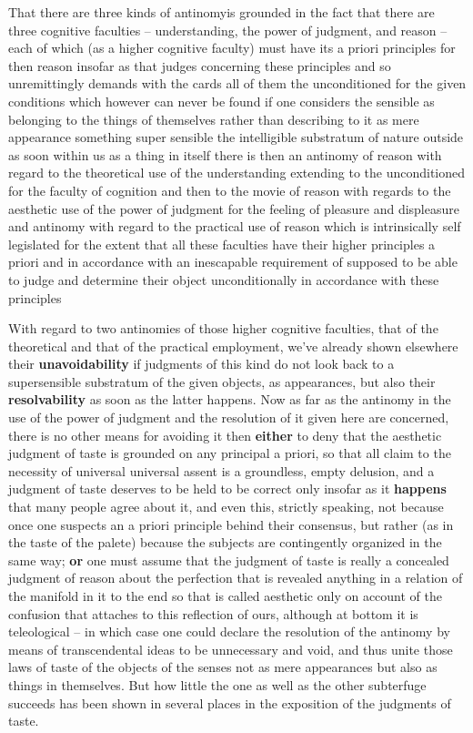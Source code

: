 \documentclass{article}
\begin{document}
That there are three kinds of antinomyis grounded 
in the fact that there are three cognitive faculties --
understanding, the power of judgment, and reason --
each of which (as a higher cognitive faculty) must have its a priori principles 
for then reason insofar as that judges concerning these principles
and so unremittingly demands with the cards all of them the unconditioned 
for the given conditions which however can never be found if one considers
the sensible as belonging to the things of themselves
rather than describing to it as mere appearance something super sensible 
the intelligible substratum of nature outside as soon within us 
as a thing in itself there is then an antinomy of reason with regard 
to the theoretical use of the understanding extending to the unconditioned 
for the faculty of cognition and then to the movie of reason with regards
to the aesthetic use of the power of judgment for the feeling of pleasure
and displeasure and antinomy with regard to the practical use of reason
which is intrinsically self legislated for the extent that all these faculties 
have their higher principles a priori and in accordance with an inescapable 
requirement of supposed to be able to judge and determine their object
unconditionally in accordance with these principles

With regard to two antinomies of those higher cognitive faculties,
that of the theoretical and that of the practical employment, 
we've already shown elsewhere their \textbf{unavoidability} 
if judgments of this kind do not look back to a supersensible substratum
of the given objects, as appearances, but also their \textbf{resolvability} 
as soon as the latter happens.
Now as far as the antinomy in the use of the power of judgment 
and the resolution of it given here are concerned, 
there is no other means for avoiding it then
\textbf{either} to deny that the
aesthetic judgment of taste is grounded on any principal a priori, 
so that all claim to the necessity of universal universal assent is a 
groundless, empty delusion, and a judgment of taste deserves to be held to be
correct only insofar as it \textbf{happens} that many people agree about it,
and even this, strictly speaking, not because once one suspects an a priori 
principle behind their consensus, but rather (as in the taste of the palete)
because the subjects are contingently organized in the same way;
\textbf{or} one must assume that the judgment of taste is really a concealed 
judgment of reason about the perfection that is revealed anything in a relation
of the manifold in it to the end so that is called aesthetic only on account
of the confusion that attaches to this reflection of ours, although at
bottom it is teleological -- in which case one could declare the resolution
of the antinomy by means of transcendental ideas to be unnecessary 
and void, and thus unite those laws of taste of the objects of the senses
not as mere appearances but also as things in themselves. 
But how little the one as well as the other subterfuge succeeds
has been shown in several places in the exposition of the 
judgments of taste.
\end{document}
